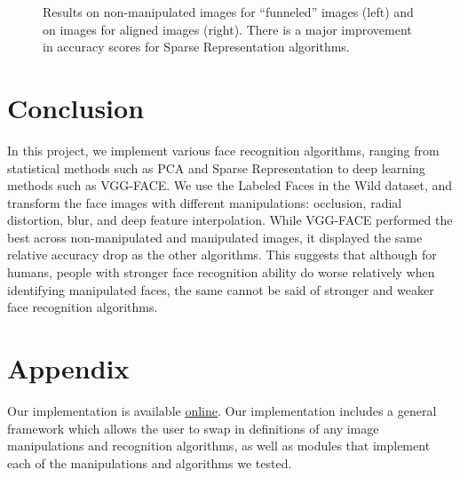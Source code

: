 \documentclass[pageno]{cos429}
\begin{document}
\begin{figure}[ht]
\centering
{}
\caption{Results on non-manipulated images for ``funneled'' images (left) and on images for aligned images (right). There is a major improvement in accuracy scores for Sparse Representation algorithms.}
\label{fig:results_alignment}
\end{figure}

\section{Conclusion}
In this project, we implement various face recognition algorithms, ranging from statistical methods such as PCA and Sparse Representation to deep learning methods such as VGG-FACE. We use the Labeled Faces in the Wild dataset, and transform the face images with different manipulations: occlusion, radial distortion, blur, and deep feature interpolation. While VGG-FACE performed the best across non-manipulated and manipulated images, it displayed the same relative accuracy drop as the other algorithms. This suggests that although for humans, people with stronger face recognition ability do worse relatively when identifying manipulated faces, the same cannot be said of stronger and weaker face recognition algorithms.



 
\section{Appendix}\label{sec:Appendix}
Our implementation is available \href{https://github.com/cchen23/COS429_final_project}{online}. Our implementation includes a general framework which allows the user to swap in definitions of any image manipulations and recognition algorithms, as well as modules that implement each of the manipulations and algorithms we tested.
\end{document}
